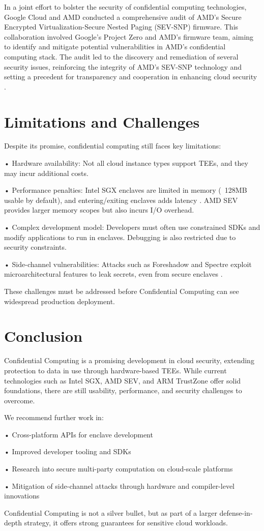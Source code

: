 \documentclass[conference]{IEEEtran}
\begin{document}
In a joint effort to bolster the security of confidential computing technologies, Google Cloud and 
AMD conducted a comprehensive audit of AMD's Secure Encrypted Virtualization-Secure Nested Paging 
(SEV-SNP) firmware. This collaboration involved Google's Project Zero and AMD's firmware team, 
aiming to identify and mitigate potential vulnerabilities in AMD's confidential computing stack. 
The audit led to the discovery and remediation of several security issues, reinforcing the 
integrity of AMD's SEV-SNP technology and setting a precedent for transparency and cooperation 
in enhancing cloud security \cite{wired}.

\section{Limitations and Challenges}
Despite its promise, confidential computing still faces key limitations:

• Hardware availability: Not all cloud instance types support TEEs, and they may incur 
additional costs.

• Performance penalties: Intel SGX enclaves are limited in memory (~128MB usable by default), 
and entering/exiting enclaves adds latency \cite{costan2016intel}. AMD SEV provides larger memory scopes but also 
incurs I/O overhead.

• Complex development model: Developers must often use constrained SDKs and modify applications 
to run in enclaves. Debugging is also restricted due to security constraints.

• Side-channel vulnerabilities: Attacks such as Foreshadow and Spectre exploit microarchitectural 
features to leak secrets, even from secure enclaves \cite{van2018foreshadow}.

These challenges must be addressed before Confidential Computing can see widespread production 
deployment.

\section{Conclusion}
Confidential Computing is a promising development in cloud security, extending protection to data 
in use through hardware-based TEEs. While current technologies such as Intel SGX, AMD SEV, and ARM 
TrustZone offer solid foundations, there are still usability, performance, and security challenges 
to overcome.

We recommend further work in:

• Cross-platform APIs for enclave development

• Improved developer tooling and SDKs

• Research into secure multi-party computation on cloud-scale platforms

• Mitigation of side-channel attacks through hardware and compiler-level innovations

Confidential Computing is not a silver bullet, but as part of a larger defense-in-depth strategy, 
it offers strong guarantees for sensitive cloud workloads.



\end{document}
